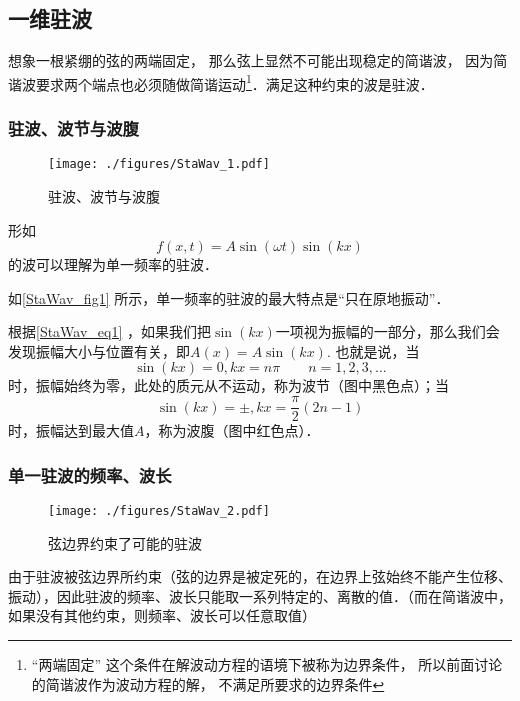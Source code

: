 
\begin{issues}
\issueDraft
\end{issues}


\subsection{一维驻波}
想象一根紧绷的弦的两端固定， 那么弦上显然不可能出现稳定的简谐波， 因为简谐波要求两个端点也必须随做简谐运动\footnote{“两端固定” 这个条件在解波动方程的语境下被称为边界条件， 所以前面讨论的简谐波作为波动方程的解， 不满足所要求的边界条件}．满足这种约束的波是驻波．

\subsubsection{驻波、波节与波腹}
\begin{figure}[ht]
\centering
\texttt{[image: ./figures/StaWav\_1.pdf]}
\caption{驻波、波节与波腹} \label{StaWav_fig1}
\end{figure}

形如
\begin{equation}\label{StaWav_eq1}
f(x,t)=A\sin(\omega t)\sin(kx)
\end{equation}
的波可以理解为单一频率的驻波．

如\autoref{StaWav_fig1} 所示，单一频率的驻波的最大特点是“只在原地振动”．

根据\autoref{StaWav_eq1} ，如果我们把$\sin(kx)$一项视为振幅的一部分，那么我们会发现振幅大小与位置有关，即$A(x) = A \sin(kx)$. 也就是说，当$$\sin(kx)=0, kx=n\pi \qquad n=1,2,3,...$$时，振幅始终为零，此处的质元从不运动，称为波节（图中黑色点）；当$$\sin(kx)=\pm, kx=\frac{\pi}{2} (2n-1)$$时，振幅达到最大值$A$，称为波腹（图中红色点）．

\subsubsection{单一驻波的频率、波长}
\begin{figure}[ht]
\centering
\texttt{[image: ./figures/StaWav\_2.pdf]}
\caption{弦边界约束了可能的驻波} \label{StaWav_fig2}
\end{figure}

由于驻波被弦边界所约束（弦的边界是被定死的，在边界上弦始终不能产生位移、振动），因此驻波的频率、波长只能取一系列特定的、离散的值．（而在简谐波中，如果没有其他约束，则频率、波长可以任意取值）

